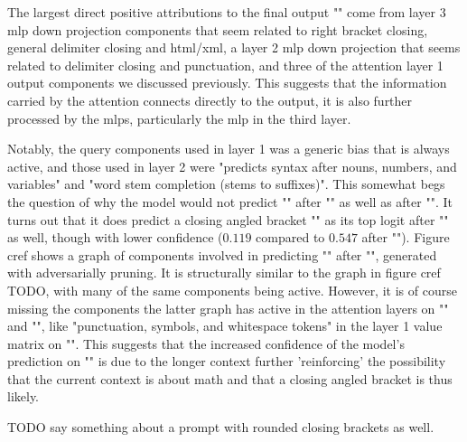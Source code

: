 \documentclass{article}
\begin{document}
The largest direct positive attributions to the final output "\code{>}" come from layer 3 mlp down projection components that seem related to right bracket closing, general delimiter closing and html/xml, a layer 2 mlp down projection that seems related to delimiter closing and punctuation, and three of the attention layer 1 output components we discussed previously. This suggests that the information carried by the attention connects directly to the output, it is also further processed by the mlps, particularly the mlp in the third layer.

Notably, the query components used in layer 1 was a generic bias that is always active, and those used in layer 2 were "predicts syntax after nouns, numbers, and variables" and "word stem completion (stems to suffixes)". This somewhat begs the question of why the model would not predict "\code{>}" after "" as well as after "". It turns out that it does predict a closing angled bracket "\code{>}" as its top logit after "" as well, though with lower confidence ($0.119$ compared to $0.547$ after ""). Figure cref shows a graph of components involved in predicting "\code{>}" after "", generated with adversarially pruning. It is structurally similar to the graph in figure cref TODO, with many of the same components being active. However, it is of course missing the components the latter graph has active in the attention layers on "" and "\code{,}", like "punctuation, symbols, and whitespace tokens" in the layer 1 value matrix on "\code{,}". This suggests that the increased confidence of the model's prediction on "" is due to the longer context further 'reinforcing' the possibility that the current context is about math and that a closing angled bracket is thus likely.

TODO say something about a prompt with rounded closing brackets as well.



\end{document}
